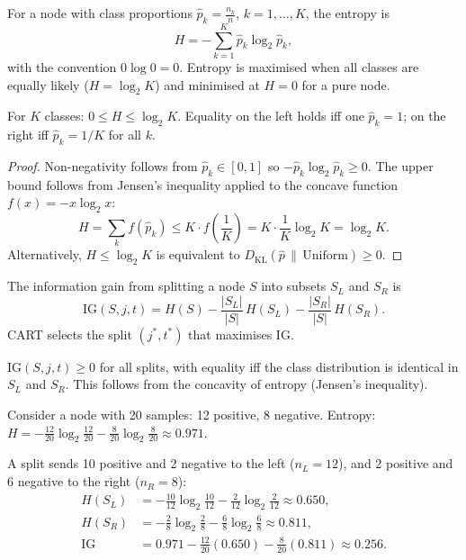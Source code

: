 \begin{definition}
For a node with class proportions $\hat{p}_k = \frac{n_k}{n}$, $k = 1,\ldots,K$, the entropy is
\[
    H = -\sum_{k=1}^{K} \hat{p}_k \log_2 \hat{p}_k,
\]
with the convention $0\log 0 = 0$. Entropy is maximised when all classes are equally likely ($H = \log_2 K$) and minimised at $H = 0$ for a pure node.
\end{definition}

\begin{theorem}
For $K$ classes: $0 \leq H \leq \log_2 K$. Equality on the left holds iff one $\hat{p}_k = 1$; on the right iff $\hat{p}_k = 1/K$ for all $k$.
\end{theorem}

\begin{proof}
Non-negativity follows from $\hat{p}_k \in [0,1]$ so $-\hat{p}_k\log_2\hat{p}_k \geq 0$. The upper bound follows from Jensen's inequality applied to the concave function $f(x) = -x\log_2 x$:
\[
    H = \sum_k f(\hat{p}_k) \leq K\cdot f\!\left(\frac{1}{K}\right) = K\cdot\frac{1}{K}\log_2 K = \log_2 K.
\]
Alternatively, $H \leq \log_2 K$ is equivalent to $D_{\text{KL}}(\hat{p}\,\|\,\text{Uniform}) \geq 0$.
\end{proof}

\begin{definition}
The information gain from splitting a node $S$ into subsets $S_L$ and $S_R$ is
\[
    \text{IG}(S, j, t) = H(S) - \frac{|S_L|}{|S|}\,H(S_L) - \frac{|S_R|}{|S|}\,H(S_R).
\]
CART selects the split $(j^*,t^*)$ that maximises IG.
\end{definition}

\begin{proposition}
$\text{IG}(S,j,t) \geq 0$ for all splits, with equality iff the class distribution is identical in $S_L$ and $S_R$. This follows from the concavity of entropy (Jensen's inequality).
\end{proposition}

\begin{example}
Consider a node with 20 samples: 12 positive, 8 negative. Entropy: $H = -\frac{12}{20}\log_2\frac{12}{20} - \frac{8}{20}\log_2\frac{8}{20} \approx 0.971$.

A split sends 10 positive and 2 negative to the left ($n_L=12$), and 2 positive and 6 negative to the right ($n_R=8$):
\begin{align*}
    H(S_L) &= -\tfrac{10}{12}\log_2\tfrac{10}{12} - \tfrac{2}{12}\log_2\tfrac{2}{12} \approx 0.650, \\
    H(S_R) &= -\tfrac{2}{8}\log_2\tfrac{2}{8} - \tfrac{6}{8}\log_2\tfrac{6}{8} \approx 0.811, \\
    \text{IG} &= 0.971 - \tfrac{12}{20}(0.650) - \tfrac{8}{20}(0.811) \approx 0.256.
\end{align*}
\end{example}

